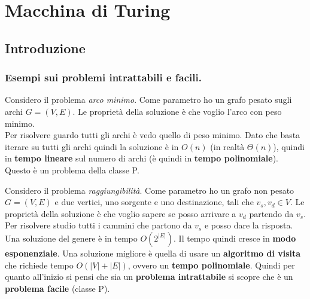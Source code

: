 
\chapter{Macchina di Turing}

\label{Capitolo 3}
\section{Introduzione}
\subsection{Esempi sui problemi intrattabili e facili.}
\begin{esempio}
	Considero il problema \emph{arco minimo}. Come parametro ho un grafo pesato
	sugli archi $G=(V,E)$. Le proprietà della soluzione è che voglio l'arco con
	peso minimo.\\
	Per risolvere guardo tutti gli archi è vedo quello di peso minimo. Dato che
	basta iterare su tutti gli archi quindi la soluzione è in $O(n)$ (in realtà
	$\Theta(n)$), quindi in \textbf{tempo lineare} sul numero di archi (è quindi
	in \textbf{tempo polinomiale}). Questo è un problema della classe P.
\end{esempio}
\begin{esempio}
	Considero il problema \emph{raggiungibilità}. Come parametro ho un grafo non
	pesato $G=(V,E)$ e due vertici, uno sorgente e uno destinazione, tali che
	$v_s,v_d\in V$. Le proprietà della soluzione è che voglio sapere se posso
	arrivare a $v_d$ partendo da $v_s$.\\
	Per risolvere studio tutti i cammini che partono da $v_s$ e posso dare la
	risposta. Una soluzione del genere è in tempo $O(2^{|E|})$. Il tempo quindi
	cresce in \textbf{modo esponenziale}. Una soluzione migliore è quella di usare
	un \textbf{algoritmo di visita} che richiede tempo $O(|V|+|E|)$, ovvero un
	\textbf{tempo polinomiale}. Quindi per quanto all'inizio si pensi
	che sia un \textbf{problema intrattabile} si scopre che è un \textbf{problema
	facile} (classe P).
\end{esempio}
